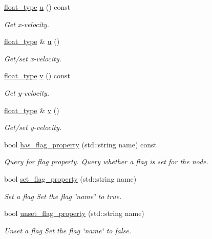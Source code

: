 \begin{DoxyCompactItemize}
\hyperlink{namespacelb_a2b37d1585aef2d3da421ad0aedc6b11b}{float\-\_\-type} \hyperlink{structlb_1_1node_a4399cc71d3bc660d10e74f2f0d91f963}{u} () const 
\begin{DoxyCompactList}\small\item\em \-Get x-\/velocity. \end{DoxyCompactList}\item 
\hyperlink{namespacelb_a2b37d1585aef2d3da421ad0aedc6b11b}{float\-\_\-type} \& \hyperlink{structlb_1_1node_ac59af9128abb3a758bc79198cf02676d}{u} ()
\begin{DoxyCompactList}\small\item\em \-Get/set x-\/velocity. \end{DoxyCompactList}\item 
\hyperlink{namespacelb_a2b37d1585aef2d3da421ad0aedc6b11b}{float\-\_\-type} \hyperlink{structlb_1_1node_ac3fd5388ecdddf266dc138bb3d9afa9c}{v} () const 
\begin{DoxyCompactList}\small\item\em \-Get y-\/velocity. \end{DoxyCompactList}\item 
\hyperlink{namespacelb_a2b37d1585aef2d3da421ad0aedc6b11b}{float\-\_\-type} \& \hyperlink{structlb_1_1node_a07f47a22567a8fb6f53d3c4940077690}{v} ()
\begin{DoxyCompactList}\small\item\em \-Get/set y-\/velocity. \end{DoxyCompactList}\item 
bool \hyperlink{structlb_1_1node_a21d1d2710d5b100a29129045f4372b89}{has\-\_\-flag\-\_\-property} (std\-::string name) const 
\begin{DoxyCompactList}\small\item\em \-Query for flag property. \-Query whether a flag is set for the node. \end{DoxyCompactList}\item 
bool \hyperlink{structlb_1_1node_a4fff022fed988c74344a97fd1000cbd2}{set\-\_\-flag\-\_\-property} (std\-::string name)
\begin{DoxyCompactList}\small\item\em \-Set a flag \-Set the flag \char`\"{}name\char`\"{} to true. \end{DoxyCompactList}\item 
bool \hyperlink{structlb_1_1node_a3d4b4fc0742f73f420b53a21265f6ca9}{unset\-\_\-flag\-\_\-property} (std\-::string name)
\begin{DoxyCompactList}\small\item\em \-Unset a flag \-Set the flag \char`\"{}name\char`\"{} to false. \end{DoxyCompactList}\item 

\end{DoxyCompactItemize}

